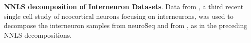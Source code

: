 \textbf{NNLS decomposition of Interneuron Datasets}. Data from \citep{Paul_2017}, a third recent single cell study of neocortical neurons focusing on interneurons, was used to decompose the interneuron samples from neuroSeq and from \citep{Tasic_2018,Zeisel_2018}, as in the preceding NNLS decompositions.